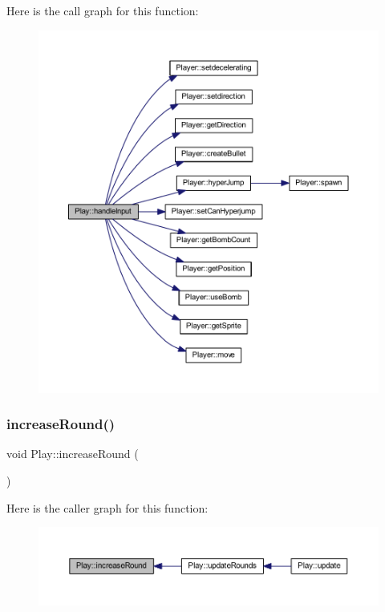 Here is the call graph for this function\+:
\nopagebreak
\begin{figure}[H]
\begin{center}
\leavevmode
\includegraphics[width=350pt]{class_play_a81bdbd1ef7b3de50dba1a8ebf346a1fc_cgraph}
\end{center}
\end{figure}
\mbox{\label{class_play_a053a009efbee3c190b2d8449a751fbae}} 
\subsubsection{\texorpdfstring{increase\+Round()}{increaseRound()}}
{\footnotesize\ttfamily void Play\+::increase\+Round (\begin{DoxyParamCaption}{ }\end{DoxyParamCaption})}

Here is the caller graph for this function\+:
\nopagebreak
\begin{figure}[H]
\begin{center}
\leavevmode
\includegraphics[width=350pt]{class_play_a053a009efbee3c190b2d8449a751fbae_icgraph}
\end{center}
\end{figure}
\mbox{\label{class_play_af923e24bb8d24800e6481b18ce6f1e7b}} 
